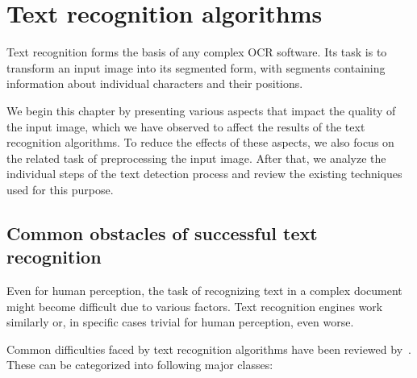 \chapter{Text recognition algorithms}

Text recognition forms the basis of any complex OCR software. Its task is to transform an input image into its segmented form, with segments containing information about individual characters and their positions.

We begin this chapter by presenting various aspects that impact the quality of the input image, which we have observed to affect the results of the text recognition algorithms. To reduce the effects of these aspects, we also focus on the related task of preprocessing the input image. After that, we analyze the individual steps of the text detection process and review the existing techniques used for this purpose.
	
\section{Common obstacles of successful text recognition}

Even for human perception, the task of recognizing text in a complex document might become difficult due to various factors. Text recognition engines work similarly or, in specific cases trivial for human perception, even worse.

Common difficulties faced by text recognition algorithms have been reviewed by~\citet{preprocessAll}. These can be categorized into following major classes:

